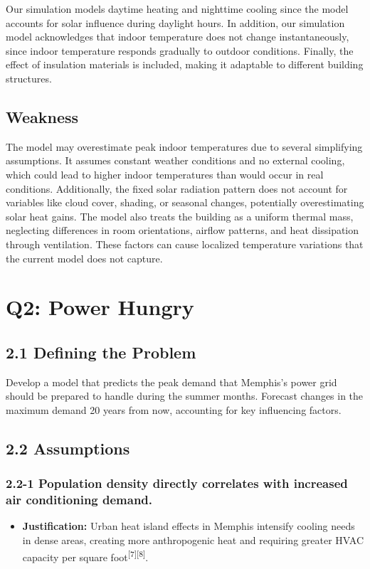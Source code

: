 \documentclass{article}
\begin{document}
Our simulation models daytime heating and nighttime cooling since the model accounts for solar influence during daylight hours. In addition, our simulation model acknowledges that indoor temperature does not change instantaneously, since indoor temperature responds gradually to outdoor conditions. Finally, the effect of insulation materials is included, making it adaptable to different building structures.

\subsection*{Weakness}

The model may overestimate peak indoor temperatures due to several simplifying assumptions. It assumes constant weather conditions and no external cooling, which could lead to higher indoor temperatures than would occur in real conditions. Additionally, the fixed solar radiation pattern does not account for variables like cloud cover, shading, or seasonal changes, potentially overestimating solar heat gains. The model also treats the building as a uniform thermal mass, neglecting differences in room orientations, airflow patterns, and heat dissipation through ventilation. These factors can cause localized temperature variations that the current model does not capture.



\section*{$\mathbf{Q2}$: Power Hungry}
\subsection*{2.1 Defining the Problem}
Develop a model that predicts the peak demand that Memphis's power grid should be prepared to handle during the summer months. Forecast changes in the maximum demand 20 years from now, accounting for key influencing factors.

\subsection*{2.2 Assumptions}
\subsubsection*{2.2-1 Population density directly correlates with increased air conditioning demand.}
\begin{itemize}
    \item \textbf{Justification:} Urban heat island effects in Memphis intensify cooling needs in dense areas, creating more anthropogenic heat and requiring greater HVAC capacity per square foot\textsuperscript{[7]}\textsuperscript{[8]}.
\end{itemize}
\end{document}
